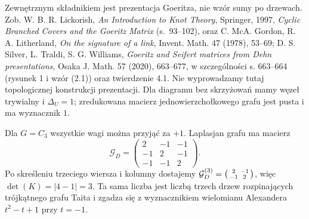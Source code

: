 \begin{uwaga}
Zewnętrznym składnikiem jest prezentacja Goeritza,
nie wzór sumy po drzewach. Zob. W. B. R. Lickorish,
\emph{An Introduction to Knot Theory}, Springer, 1997,
\emph{Cyclic Branched Covers and the Goeritz Matrix} (s.~93--102),
oraz C. McA. Gordon, R. A. Litherland,
\emph{On the signature of a link}, Invent. Math. 47 (1978),
53--69; D. S. Silver, L. Traldi, S. G. Williams,
\emph{Goeritz and Seifert matrices from Dehn presentations},
Osaka J. Math. 57 (2020), 663--677, w szczególności
s. 663--664 (rysunek 1 i wzór (2.1)) oraz twierdzenie 4.1.
Nie wyprowadzamy tutaj topologicznej konstrukcji
prezentacji. Dla diagramu bez skrzyżowań mamy węzeł
trywialny i $\Delta_U=1$; zredukowana macierz
jednowierzchołkowego grafu jest pusta i ma wyznacznik $1$.
\end{uwaga}

\begin{przyklad}
Dla $G=C_3$ wszystkie wagi można przyjąć za $+1$.
Laplasjan grafu ma macierz
\[
\mathcal G_D=\begin{pmatrix}
 2&-1&-1\\ -1&2&-1\\ -1&-1&2
\end{pmatrix}.
\]
Po skreśleniu trzeciego wiersza i kolumny dostajemy
$\mathcal G_D^{(3)}=\begin{psmallmatrix}2&-1\\-1&2\end{psmallmatrix}$,
więc $\det(K)=|4-1|=3$.
Ta sama liczba jest liczbą trzech drzew rozpinających
trójkątnego grafu Taita i zgadza się z wyznacznikiem
wielomianu Alexandera $t^2-t+1$ przy $t=-1$.
\end{przyklad}

